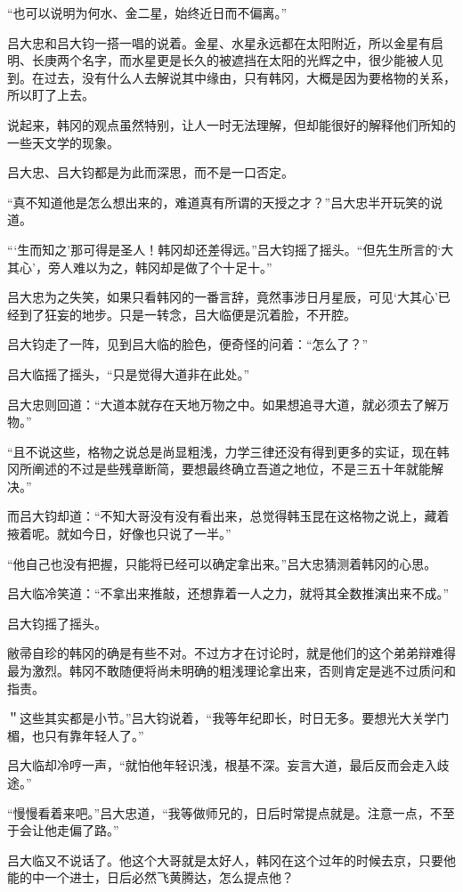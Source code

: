 “也可以说明为何水、金二星，始终近日而不偏离。”

吕大忠和吕大钧一搭一唱的说着。金星、水星永远都在太阳附近，所以金星有启明、长庚两个名字，而水星更是长久的被遮挡在太阳的光辉之中，很少能被人见到。在过去，没有什么人去解说其中缘由，只有韩冈，大概是因为要格物的关系，所以盯了上去。

说起来，韩冈的观点虽然特别，让人一时无法理解，但却能很好的解释他们所知的一些天文学的现象。

吕大忠、吕大钧都是为此而深思，而不是一口否定。

“真不知道他是怎么想出来的，难道真有所谓的天授之才？”吕大忠半开玩笑的说道。

“‘生而知之’那可得是圣人！韩冈却还差得远。”吕大钧摇了摇头。“但先生所言的‘大其心’，旁人难以为之，韩冈却是做了个十足十。”

吕大忠为之失笑，如果只看韩冈的一番言辞，竟然事涉日月星辰，可见‘大其心’已经到了狂妄的地步。只是一转念，吕大临便是沉着脸，不开腔。

吕大钧走了一阵，见到吕大临的脸色，便奇怪的问着：“怎么了？”

吕大临摇了摇头，“只是觉得大道非在此处。”

吕大忠则回道：“大道本就存在天地万物之中。如果想追寻大道，就必须去了解万物。”

“且不说这些，格物之说总是尚显粗浅，力学三律还没有得到更多的实证，现在韩冈所阐述的不过是些残章断简，要想最终确立吾道之地位，不是三五十年就能解决。”

而吕大钧却道：“不知大哥没有没有看出来，总觉得韩玉昆在这格物之说上，藏着掖着呢。就如今日，好像也只说了一半。”

“他自己也没有把握，只能将已经可以确定拿出来。”吕大忠猜测着韩冈的心思。

吕大临冷笑道：“不拿出来推敲，还想靠着一人之力，就将其全数推演出来不成。”

吕大钧摇了摇头。

敝帚自珍的韩冈的确是有些不对。不过方才在讨论时，就是他们的这个弟弟辩难得最为激烈。韩冈不敢随便将尚未明确的粗浅理论拿出来，否则肯定是逃不过质问和指责。

＂这些其实都是小节。”吕大钧说着，“我等年纪即长，时日无多。要想光大关学门楣，也只有靠年轻人了。”

吕大临却冷哼一声，“就怕他年轻识浅，根基不深。妄言大道，最后反而会走入歧途。”

“慢慢看着来吧。”吕大忠道，“我等做师兄的，日后时常提点就是。注意一点，不至于会让他走偏了路。”

吕大临又不说话了。他这个大哥就是太好人，韩冈在这个过年的时候去京，只要他能的中一个进士，日后必然飞黄腾达，怎么提点他？

